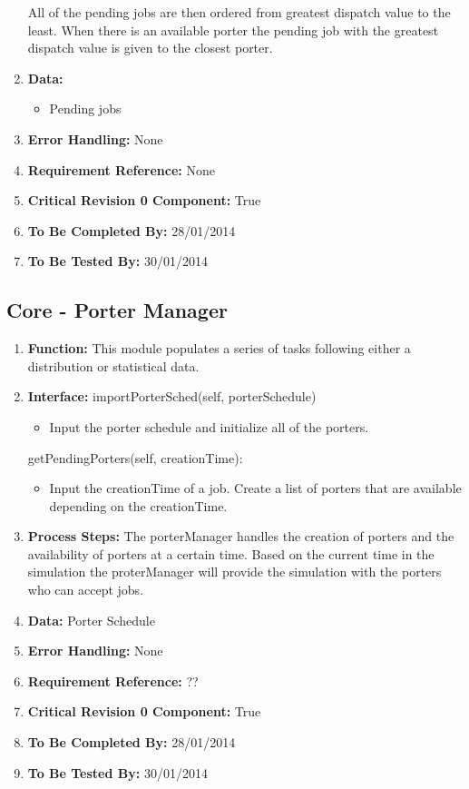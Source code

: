 \documentclass[paper=letter, fontsize=10pt]{scrartcl}
\numberwithin{equation}{section}		%
\numberwithin{figure}{section}			%
\numberwithin{table}{section}				%
\begin{document}
\begin{enumerate}[]
	All of the pending jobs are then ordered from greatest dispatch value to the least.  When there is an available porter the pending job with the greatest dispatch value is given to the closest porter.
	\item \textbf{Data:}
		\begin{itemize}
			\item Pending jobs
		\end{itemize}
	\item \textbf{Error Handling:} None
	\item \textbf{Requirement Reference:} None
	\item \textbf{Critical Revision 0 Component:} True
	\item \textbf{To Be Completed By:} 28/01/2014
	\item \textbf{To Be Tested By:} 30/01/2014
\end{enumerate}
\subsection{Core - Porter Manager}
\begin{enumerate}[]
	\item \textbf{Function:} This module populates a series of tasks following either a distribution or statistical data.
	\item \textbf{Interface:} \newline
		importPorterSched(self, porterSchedule)
		\begin{itemize}
			\item Input the porter schedule and initialize all of the porters.
		\end{itemize}
		getPendingPorters(self, creationTime):
		\begin{itemize}
			\item Input the creationTime of a job.  Create a list of porters that  are available depending on the creationTime.  
		\end{itemize}
		
	\item \textbf{Process Steps:} The porterManager handles the creation of porters and the availability of porters at a certain time.  Based on the current time in the simulation the proterManager will provide the simulation with the porters who can accept jobs.
	
	\item \textbf{Data:} Porter Schedule
	\item \textbf{Error Handling:} None
	\item \textbf{Requirement Reference:} ??
	\item \textbf{Critical Revision 0 Component:} True
	\item \textbf{To Be Completed By:} 28/01/2014
	\item \textbf{To Be Tested By:} 30/01/2014
	
\end{enumerate}
\end{document}
